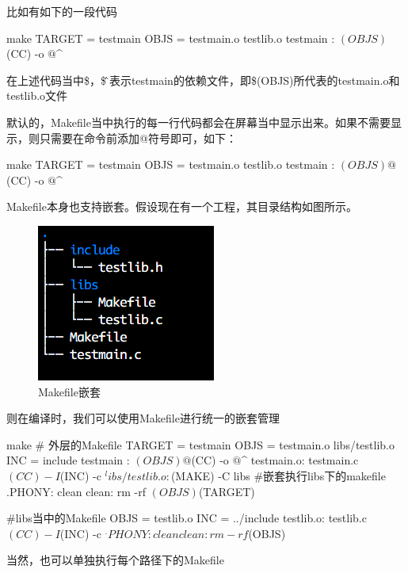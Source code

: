 比如有如下的一段代码
\begin{code-block}{make}
TARGET = testmain
OBJS = testmain.o testlib.o
testmain : $(OBJS)
        $(CC) -o $@ $^
\end{code-block}

在上述代码当中\$，\$\^则表示testmain的依赖文件，即\$(OBJS)所代表的testmain.o和testlib.o文件

默认的，Makefile当中执行的每一行代码都会在屏幕当中显示出来。如果不需要显示，则只需要在命令前添加@符号即可，如下：
\begin{code-block}{make}
TARGET = testmain
OBJS = testmain.o testlib.o
testmain : $(OBJS)
        @$(CC) -o $@ $^
\end{code-block}

Makefile本身也支持嵌套。假设现在有一个工程，其目录结构如图所示。
\begin{figure}[H]
  \centering
  \includegraphics[scale=1.0]{make.png}
  \caption{Makefile嵌套}
  \label{fig:submake}
\end{figure}

则在编译时，我们可以使用Makefile进行统一的嵌套管理
\begin{code-block}{make}
# 外层的Makefile
TARGET = testmain
OBJS = testmain.o libs/testlib.o
INC = include
testmain : $(OBJS)
        @$(CC) -o $@ $^
testmain.o: testmain.c
        $(CC) -I$(INC) -c $^
libs/testlib.o:
        $(MAKE) -C libs #嵌套执行libs下的makefile
.PHONY: clean
clean:
        rm -rf $(OBJS) $(TARGET)

#libs当中的Makefile
OBJS = testlib.o
INC = ../include
testlib.o: testlib.c
        $(CC) -I$(INC) -c $^
.PHONY: clean
clean:
        rm -rf $(OBJS)
\end{code-block}

当然，也可以单独执行每个路径下的Makefile
